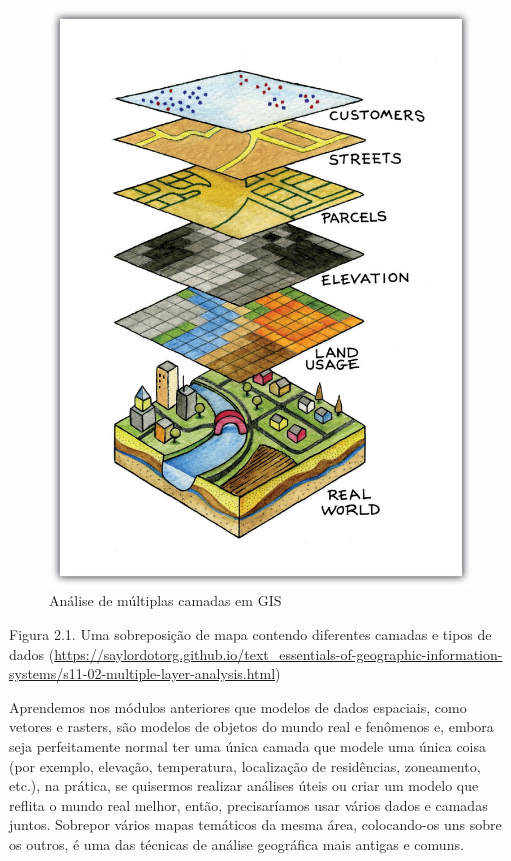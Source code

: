 \documentclass[
]{krantz}
\begin{document}
\begin{figure}
\centering
\includegraphics{media/modulo2/spatial-layers.jpg}
\caption{Análise de múltiplas camadas em GIS}
\end{figure}

Figura 2.1. Uma sobreposição de mapa contendo diferentes camadas e tipos de dados (\href{https://saylordotorg.\%20github.io/text_essentials-of-geographic-information-systems/s11-02-multiple-layer-analysis.html}{https://saylordotorg.github.io/text\_essentials-of-geographic-information-systems/s11-02-multiple-layer-analysis.html})

Aprendemos nos módulos anteriores que modelos de dados espaciais, como vetores e rasters, são modelos de objetos do mundo real e fenômenos e, embora seja perfeitamente normal ter uma única camada que modele uma única coisa (por exemplo, elevação, temperatura, localização de residências, zoneamento, etc.), na prática, se quisermos realizar análises úteis ou criar um modelo que reflita o mundo real melhor, então, precisaríamos usar vários dados e camadas juntos. Sobrepor vários mapas temáticos da mesma área, colocando-os uns sobre os outros, é uma das técnicas de análise geográfica mais antigas e comuns.
\end{document}
